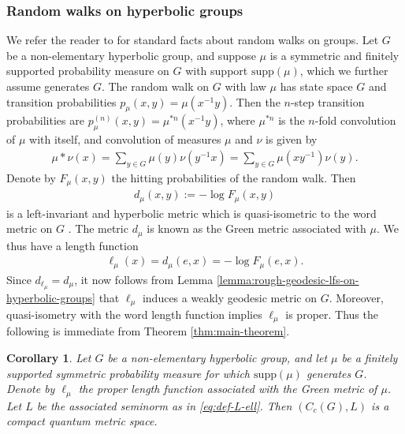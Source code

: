 \documentclass[12pt,a4paper,oneside,final,reqno]{amsart}
\theoremstyle{plain}
\newtheorem{corollary}[theorem]{Corollary}
\theoremstyle{definition}
\begin{document}
\subsubsection{Random walks on hyperbolic groups}
%
We refer the reader to \cite{WoessRandomWalks2000} for standard facts about random walks on groups. 
Let $G$ be a non-elementary hyperbolic group, and suppose $\mu$ is a symmetric and finitely supported probability measure on $G$ with support $\mathrm{supp}(\mu)$, which we further assume generates $G$. The random walk on $G$ with law $\mu$ has state space $G$ and transition probabilities $p_\mu (x,y) = \mu(x^{-1}y)$. Then the $n$-step transition probabilities are $p^{(n)}_\mu (x,y ) = \mu^{*n}(x^{-1}y)$, where $\mu^{*n}$ is the $n$-fold convolution of $\mu$ with itself, and convolution of measures $\mu$ and $\nu$ is given by
\begin{align*}
    \mu * \nu (x) = \sum_{y \in G} \mu(y) \nu(y^{-1}x) =\sum_{y\in G} \mu(xy^{-1}) \nu(y).
\end{align*}
Denote by $F_\mu(x,y)$ the hitting probabilities of the random walk. 
Then 
\begin{align*}
    d_\mu(x,y) := -\log F_\mu(x,y) 
\end{align*}
is a left-invariant and hyperbolic metric which is quasi-isometric to the word metric 
on $G$ \cite[Corollary 1.2]{BlachereHaissinskyMathieu2011}. The metric $d_\mu$  is known as the Green metric associated with $\mu$. We thus have a length function
\begin{align*}
    \ell_\mu (x) = d_\mu(e,x) = -\log F_\mu (e,x).
\end{align*}
 Since $d_{\ell_\mu} = d_\mu$, it now follows from Lemma \ref{lemma:rough-geodesic-lfs-on-hyperbolic-groups} that $\ell_\mu$ induces a weakly geodesic metric on $G$. Moreover, quasi-isometry with the word length function implies $\ell_\mu$ is proper. Thus the following is immediate from Theorem \ref{thm:main-theorem}.


\begin{corollary}\label{cor:CQMS-from-random-walk}
Let $G$ be a non-elementary hyperbolic group, and 
let $\mu$ be a 
finitely supported symmetric probability measure for which $\mathrm{supp}(\mu)$ generates $G$. Denote by $\ell_\mu$ the proper length function associated with the Green metric of $\mu$. Let $L$ be the associated seminorm as in \eqref{eq:def-L-ell}. Then $(C_c(G), L)$ is a compact quantum metric space.
\end{corollary}
\end{document}
